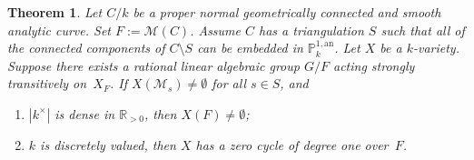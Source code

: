 \documentclass[10pt]{amsart}
\let\backslash\setminus
\newtheorem{thm}{Theorem}[section]
\theoremstyle{definition}
\begin{document}
\begin{thm} \label{5.6} Let $C/k$ be a proper normal geometrically connected and smooth analytic curve. Set $F:=\mathscr{M}(C)$.
Assume $C$ has a triangulation $S$ such that all of the connected components of $C \backslash S$ can be embedded in $\mathbb{P}_k^{1, \mathrm{an}}$. Let $X$ be a $k$-variety. Suppose there exists a rational linear algebraic group $G/F$ acting strongly transitively on~$X_F$.
If $X(\mathscr{M}_{s}) \neq \emptyset$ for all $s \in S$, and
\begin{enumerate}
\item $|k^{\times}|$ is dense in $\mathbb{R}_{>0}$, then $X(F) \neq \emptyset$;
\item $k$ is discretely valued, then $X$ has a zero cycle of degree one over~$F$.
\end{enumerate}
\end{thm}
\end{document}
